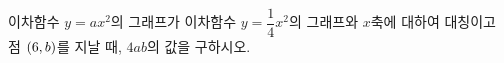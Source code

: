 이차함수 $y=ax^2$의 그래프가 이차함수 $y=\dfrac{1}{4}x^2$의 그래프와 $x$축에 대하여 대칭이고 점 $(6{,}\mkern3mu\mathopen{}b)$를 지날 때, $4ab$의 값을 구하시오. 
